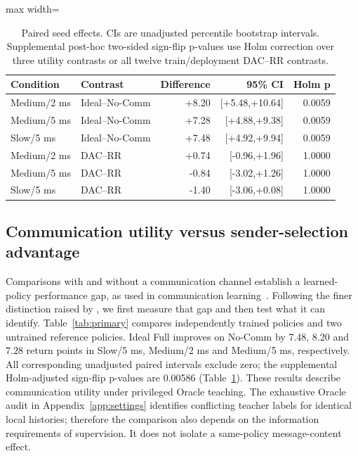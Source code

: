 \documentclass[10pt]{article}
\begin{document}
\begin{table}[!ht]\centering\setlength{\tabcolsep}{3pt}\small
\caption{Paired seed effects. CIs are unadjusted percentile bootstrap intervals. Supplemental post-hoc two-sided sign-flip p-values use Holm correction over three utility contrasts or all twelve train/deployment DAC--RR contrasts.}\label{tab:paired}
\vspace{3mm}
\begin{adjustbox}{max width=\linewidth}\begin{tabular}{llrrr}\toprule
Condition & Contrast & Difference & 95\% CI & Holm p\\\midrule
Medium/2 ms & Ideal--No-Comm & +8.20 & [+5.48,+10.64] & 0.0059\\
Medium/5 ms & Ideal--No-Comm & +7.28 & [+4.88,+9.38] & 0.0059\\
Slow/5 ms & Ideal--No-Comm & +7.48 & [+4.92,+9.94] & 0.0059\\
Medium/2 ms & DAC--RR & +0.74 & [-0.96,+1.96] & 1.0000\\
Medium/5 ms & DAC--RR & -0.84 & [-3.02,+1.26] & 1.0000\\
Slow/5 ms & DAC--RR & -1.40 & [-3.06,+0.08] & 1.0000\\
\bottomrule\end{tabular}\end{adjustbox}\end{table}
\FloatBarrier
\subsection{Communication utility versus sender-selection advantage}
Comparisons with and without a communication channel establish a learned-policy performance gap, as used in communication learning~\citep{foerster2016learning,sukhbaatar2016learning}. Following the finer distinction raised by \citet{lowe2019pitfalls}, we first measure that gap and then test what it can identify. Table~\ref{tab:primary} compares independently trained policies and two untrained reference policies. Ideal Full improves on No-Comm by 7.48, 8.20 and 7.28 return points in Slow/5 ms, Medium/2 ms and Medium/5 ms, respectively. All corresponding unadjusted paired intervals exclude zero; the supplemental Holm-adjusted sign-flip p-values are 0.00586 (Table~\ref{tab:paired}). These results describe communication utility under privileged Oracle teaching. The exhaustive Oracle audit in Appendix~\ref{app:settings} identifies conflicting teacher labels for identical local histories; therefore the comparison also depends on the information requirements of supervision. It does not isolate a same-policy message-content effect.
\end{document}
